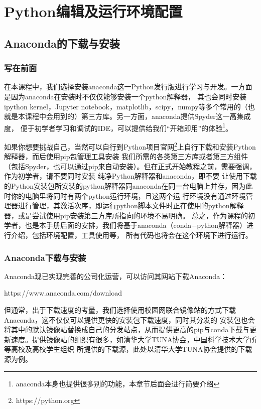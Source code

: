 \chapter{Python编辑及运行环境配置}
\section{Anaconda的下载与安装}
\subsection{写在前面}
在本课程中，我们选择安装anaconda这一Python发行版进行学习与开发。一方面是因为anaconda在安装时不仅仅能够安装一个python解释器，
其也会同时安装ipython kernel，Jupyter notebook，matplotlib，scipy，numpy等多个常用的（也就是本课程中会用到的）第三方库。另一方面，anaconda提供Spyder这一高集成度，
便于初学者学习和调试的IDE，可以提供给我们“开箱即用”的体验\footnote{anaconda本身也提供很多别的功能，本章节后面会进行简要介绍}。

如果你想要挑战自己，当然可以自行到Python项目官网\footnote{https://python.org}上自行下载和安装Python解释器，而后使用pip包管理工具安装
我们所需的各类第三方库或者第三方组件（包括Spyder，也可以通过pip来自动安装）。但在正式开始教程之前，需要强调，作为初学者，请不要同时安装
纯净Python解释器和anaconda，即不要
让使用下载的Python安装包所安装的python解释器同anaconda在同一台电脑上并存，因为此时你的电脑里将同时有两个python运行环境，且这两个运
行环境没有通过环境管理器进行管理，其激活次序，即运行python脚本文件时正在使用的python解释器，或是尝试使用pip安装第三方库所指向的环境不易明确。
总之，作为课程的初学者，也是本手册后面的安排，我们将基于anaconda（conda+python解释器）进行介绍，包括环境配置，工具使用等，
所有代码也将会在这个环境下进行运行。
\subsection{Anaconda下载与安装}
Anaconda现已实现完善的公司化运营，可以访问其网站下载Anaconda：

https://www.anaconda.com/download

但通常，出于下载速度的考量，我们选择使用校园网联合镜像站的方式下载Anaconda，这不仅仅可以提供更快的安装包下载速度，同时其分发的
安装包也会将其中的默认镜像站替换成自己的分发站点，从而提供更高的pip与conda下载与更新速度。提供镜像站的组织有很多，如清华大学TUNA协会，中国科学技术大学所等高校及高校学生组织
所提供的下载源，此处以清华大学TUNA协会提供的下载源为例。

